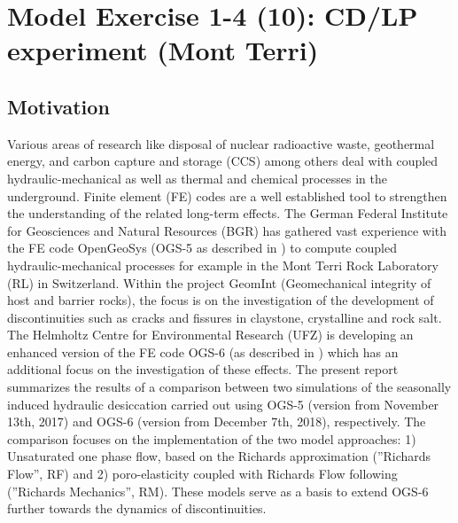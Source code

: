 \section{Model Exercise 1-4 (10): CD/LP experiment (Mont Terri)}
\label{sec:mex10}
\subsection{Motivation}
Various areas of research like disposal of nuclear radioactive waste, geothermal energy, and carbon capture and storage (CCS) among others deal with coupled hydraulic-mechanical as well as thermal and chemical processes in the underground. Finite element (FE) codes are a well established tool to strengthen the understanding of the related long-term effects. The German Federal Institute for Geosciences and Natural Resources (BGR) has gathered vast experience with the FE code OpenGeoSys (OGS-5 as described in \cite{kolditz2012})  to compute coupled  hydraulic-mechanical processes for example in the  Mont Terri Rock Laboratory (RL) in Switzerland. Within the project GeomInt (Geomechanical integrity of host and barrier rocks), the focus is on the investigation of the development of discontinuities such as cracks and fissures in claystone, crystalline and rock salt. The Helmholtz Centre for Environmental Research (UFZ) is developing an enhanced version of the FE code OGS-6 (as described in \cite{Naumov:2018}) which has an additional focus on the investigation of these effects.   The present report summarizes the results of a comparison between two simulations of the seasonally induced hydraulic desiccation carried out using OGS-5 (version from November 13th, 2017) and OGS-6 (version from December 7th, 2018), respectively. The comparison focuses on the implementation of the two model approaches: 1) Unsaturated one phase flow, based on the Richards approximation \cite{richards1931} (”Richards Flow”, RF) and 2) poro-elasticity coupled with Richards Flow following \cite{biot1941} (”Richards Mechanics”, RM). These models serve as a basis to extend OGS-6 further towards the
dynamics of discontinuities.

